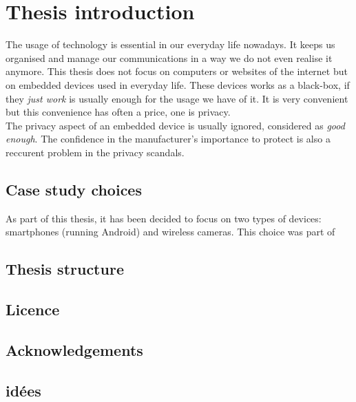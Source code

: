 \chapter{Thesis introduction}

The usage of technology is essential in our everyday life nowadays.
It keeps us organised and manage our communications in a way we do not even realise it anymore.
This thesis does not focus on computers or websites of the internet but on embedded devices used in everyday life.
These devices works as a black-box, if they \emph{just work} is usually enough for the usage we have of it.
It is very convenient but this convenience has often a price, one is privacy.\\

The privacy aspect of an embedded device is usually ignored, considered as \emph{good enough}.
The confidence in the manufacturer's importance to protect is also a reccurent problem in the privacy scandals.\\

\section{Case study choices}

As part of this thesis, it has been decided to focus on two types of devices: smartphones (running Android) and wireless cameras.
This choice was part of


\section{Thesis structure}


\section{Licence}


\section{Acknowledgements}


\section{idées}


